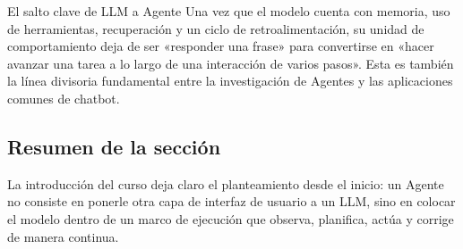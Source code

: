 \begin{importantbox}{El salto clave de LLM a Agente}
Una vez que el modelo cuenta con memoria, uso de herramientas, recuperación y un ciclo de retroalimentación, su unidad de comportamiento deja de ser «responder una frase» para convertirse en «hacer avanzar una tarea a lo largo de una interacción de varios pasos». Esta es también la línea divisoria fundamental entre la investigación de Agentes y las aplicaciones comunes de chatbot.
\end{importantbox}

\subsection{Resumen de la sección}

La introducción del curso deja claro el planteamiento desde el inicio: un Agente no consiste en ponerle otra capa de interfaz de usuario a un LLM, sino en colocar el modelo dentro de un marco de ejecución que observa, planifica, actúa y corrige de manera continua.
